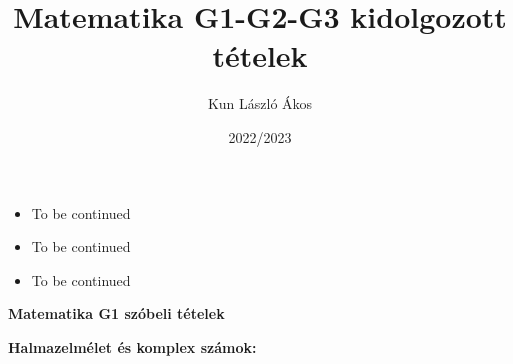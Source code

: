 \documentclass[11pt,a4paper]{article}
\title{Matematika G1-G2-G3 kidolgozott tételek}
\author{Kun László Ákos}
\date{2022/2023}
\begin{document}
\maketitle{}
\begin{tcolorbox}[colback=green!5!white,colframe=green!60!black,title= MINTA!!]
    \begin{itemize}
        \item To be continued
    \end{itemize}
\end{tcolorbox}
\begin{tcolorbox}[colback=blue!5!white,colframe=blue!70!black,title= MINTA!!]
    \begin{itemize}
        \item To be continued
    \end{itemize}
\end{tcolorbox}
\begin{tcolorbox}[colback=red!5!white,colframe=red!60!black,title= MINTA!!]
    \begin{itemize}
        \item To be continued
    \end{itemize}
\end{tcolorbox}

\newpage
\begin{center}
    \textbf{Matematika G1 szóbeli tételek}
\end{center}
\textbf{Halmazelmélet és komplex számok:}
\end{document}
